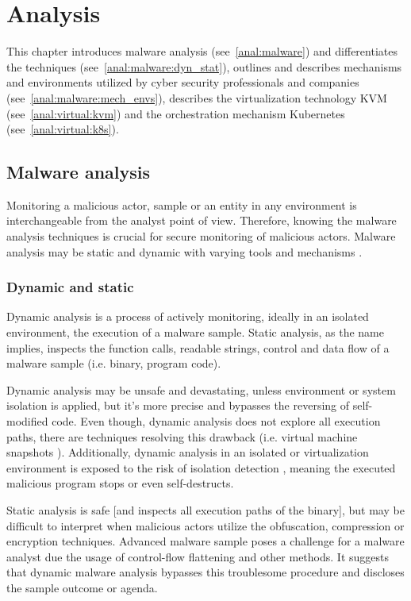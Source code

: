 \chapter{Analysis \label{anal}}
This chapter introduces malware analysis (see~\autoref{anal:malware}) and differentiates the techniques (see~\autoref{anal:malware:dyn_stat}), outlines and describes mechanisms and environments utilized by cyber security professionals and companies (see~\autoref{anal:malware:mech_envs}), describes the virtualization technology KVM (see~\autoref{anal:virtual:kvm}) and the orchestration mechanism Kubernetes (see~\autoref{anal:virtual:k8s}).

\section{Malware analysis \label{anal:malware}}
Monitoring a malicious actor, sample or an entity in any environment is interchangeable from the analyst point of view. Therefore, knowing the malware analysis techniques is crucial for secure monitoring of malicious actors. Malware analysis may be static and dynamic with varying tools and mechanisms \cite{article:malware_analysis_techniques} \cite{research:malware_analysis_2017}.

\subsection{Dynamic and static \label{anal:malware:dyn_stat}}
Dynamic analysis is a process of actively monitoring, ideally in an isolated environment, the execution of a malware sample. Static analysis, as the name implies, inspects the function calls, readable strings, control and data flow of a malware sample (i.e. binary, program code).

Dynamic analysis may be unsafe and devastating, unless environment or system isolation is applied, but it's more precise and bypasses the reversing of self-modified code. Even though, dynamic analysis does not explore all execution paths, there are techniques resolving this drawback (i.e. virtual machine snapshots \cite{research:malware_analysis_2017}). Additionally, dynamic analysis in an isolated or virtualization environment is exposed to the risk of isolation detection \cite{medium_article:malware_analysis_sandboxing}, meaning the executed malicious program stops or even self-destructs.

Static analysis is safe [and inspects all execution paths of the binary], but may be difficult to interpret when malicious actors utilize the obfuscation, compression or encryption techniques. Advanced malware sample poses a challenge for a malware analyst due the usage of control-flow flattening \cite{report:eset_static_analysis} and other methods. It suggests that dynamic malware analysis bypasses this troublesome procedure and discloses the sample outcome or agenda.

